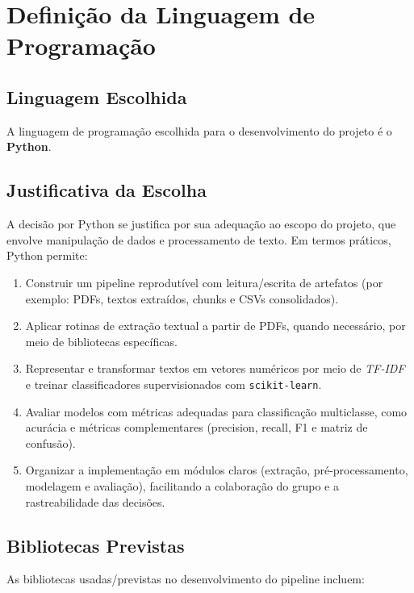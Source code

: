 \documentclass[12pt,a4paper]{article}
\begin{document}
\clearpage
\section{Definição da Linguagem de Programação}

\subsection{Linguagem Escolhida}

A linguagem de programação escolhida para o desenvolvimento do projeto é o \textbf{Python}.

\subsection{Justificativa da Escolha}

A decisão por Python se justifica por sua adequação ao escopo do projeto, que envolve manipulação de dados e processamento de texto. Em termos práticos, Python permite:

\begin{enumerate}[leftmargin=1.2cm]
    \item Construir um pipeline reprodutível com leitura/escrita de artefatos (por exemplo: PDFs, textos extraídos, chunks e CSVs consolidados).
    \item Aplicar rotinas de extração textual a partir de PDFs, quando necessário, por meio de bibliotecas específicas.
    \item Representar e transformar textos em vetores numéricos por meio de \textit{TF-IDF} e treinar classificadores supervisionados com \texttt{scikit-learn}.
    \item Avaliar modelos com métricas adequadas para classificação multiclasse, como acurácia e métricas complementares (precision, recall, F1 e matriz de confusão).
    \item Organizar a implementação em módulos claros (extração, pré-processamento, modelagem e avaliação), facilitando a colaboração do grupo e a rastreabilidade das decisões.
\end{enumerate}

\subsection{Bibliotecas Previstas}

As bibliotecas usadas/previstas no desenvolvimento do pipeline incluem:
\end{document}
